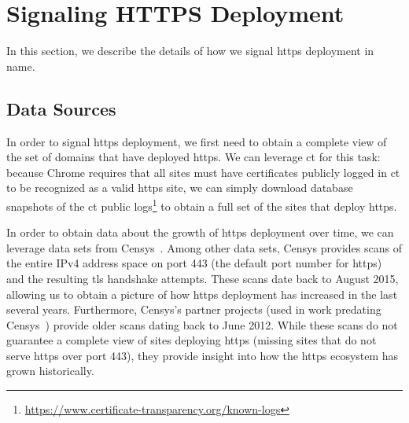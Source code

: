 \section{Signaling HTTPS Deployment}
\label{sec:signaling}

In this section, we describe the details of how we signal \ac{https} deployment
in \ac{name}.

\subsection{Data Sources}

In order to signal \ac{https} deployment, we first need to obtain a complete
view of the set of domains that have deployed \ac{https}. We can leverage
\ac{ct} for this task: because Chrome requires that all sites must have
certificates publicly logged in \ac{ct} to be recognized as a valid \ac{https}
site, we can simply download database snapshots of the \ac{ct} public
logs\footnote{\url{https://www.certificate-transparency.org/known-logs}} to
obtain a full set of the sites that deploy \ac{https}.

In order to obtain data about the growth of \ac{https} deployment over time, we
can leverage data sets from Censys~\cite{durumeric2015search}. Among other data
sets, Censys provides scans of the entire IPv4 address space on port 443 (the
default port number for \ac{https}) and the resulting \ac{tls} handshake
attempts. These scans date back to August 2015, allowing us to obtain a picture
of how \ac{https} deployment has increased in the last several years.
Furthermore, Censys's partner projects (used in work predating
Censys~\cite{durumeric2013analysis}) provide older scans dating back to June
2012. While these scans do not guarantee a complete view of sites deploying
\ac{https} (missing sites that do not serve \ac{https} over port 443), they
provide insight into how the \ac{https} ecosystem has grown historically.


